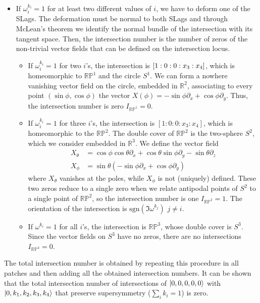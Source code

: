 \begin{itemize}
  \item If $\omega_i^{k_i}=1$ for at least two different values of $i$, we have to deform one of the SLags. 
    The deformation must be normal to both SLags and through McLean's theorem  we identify the normal bundle of the intersection
    with its tangent space.
    Then, the intersection number is the number of zeros of the non-trivial vector fields 
    that can be defined on the intersection locus.
    \begin{itemize}
  \item
    If $\omega_i^{k_i}= 1$ for two $i$'s, the intersection is $\qty[1:0:0:x_3:x_4]$, which is homeomorphic to $\mathbb{RP}^1$ and the circle $S^1$.
    We can form a nowhere vanishing vector field on the circle, embedded in $\mathbb R^2$, associating to 
    every point  $(\sin\phi,\cos\phi)$ the vector $X(\phi)=-\sin\phi\partial_x +\cos\phi\partial_y$.
    Thus, the intersection number is zero $I_{\mathbb{RP}^1}=0$.
  \item 
    If $\omega_i^{k_i}= 1$ for three $i$'s, the intersection is $[1:0:0:x_3:x_4]$, which is homeomorphic to the $\mathbb{RP}^2$.
    The double cover of $\mathbb{RP}^2$ is the two-sphere $S^2$, which we consider embedded in $\mathbb R^3$.
    We define the vector field
    \begin{align}
      X_\theta& =\cos\phi\cos\theta \partial_x+\cos\theta\sin\phi\partial_y-\sin\theta\partial_z\\
      X_\phi&=\sin\theta(-\sin\phi\partial_x+\cos\phi\partial_y)
    \end{align}
    where $X_\theta$ vanishes at the poles, while $X_\phi$ is not (uniquely) defined.
    These two zeros reduce to a single zero when we relate antipodal points of $S^2$ to a single point
    of $\mathbb{RP}^2$, so the intersection number is one $I_{\mathbb{RP}^2}=1$.
    The orientation of the intersection is $\mathrm{sgn}(\Im \omega^{k_j})$ $j\neq i$.
  \item 
    If $\omega^{k_i}=1$ for all $i$'s, the intersection is $\mathbb{RP}^3$, whose double cover is $S^3$.
    Since the vector fields on $S^3$ have no zeros, there are no intersections $I_{\mathbb{RP}^3}=0$.
    \end{itemize}
\end{itemize}

The total intersection number is obtained by repeating this procedure in all patches
and then adding all the obtained intersection numbers.
It can be shown that the total intersection number of intersections of
$\ket{0,0,0,0,0}$ with $\ket{0,k_1,k_2,k_3,k_4}$ that preserve supersymmetry ($\sum_i k_i=1$) is zero. 


